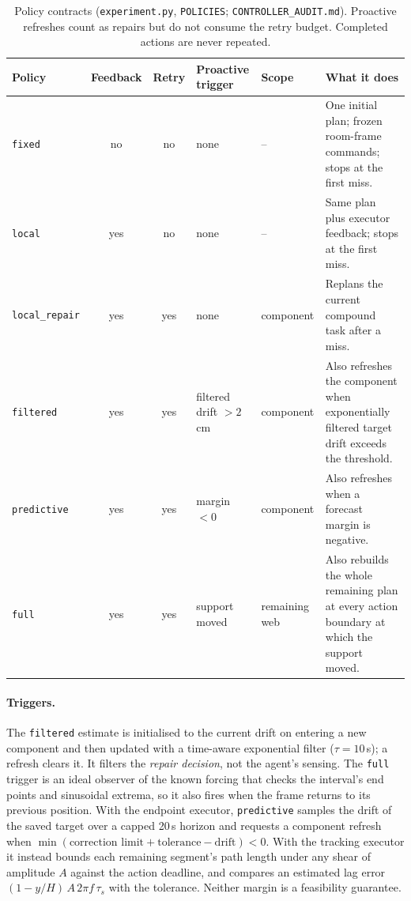 \begin{table}[htbp]
\centering
\small
\begin{tabularx}{\linewidth}{@{}l c c l l X@{}}
\toprule
Policy & Feedback & Retry & Proactive trigger & Scope & What it does \\
\midrule
\texttt{fixed} & no & no & none & -- & One initial plan; frozen room-frame commands; stops at the first miss. \\
\texttt{local} & yes & no & none & -- & Same plan plus executor feedback; stops at the first miss. \\
\texttt{local\_\allowbreak{}repair} & yes & yes & none & component & Replans the current compound task after a miss. \\
\texttt{filtered} & yes & yes & filtered drift $>2$\,cm & component & Also refreshes the component when exponentially filtered target drift exceeds the threshold. \\
\texttt{predictive} & yes & yes & margin $<0$ & component & Also refreshes when a forecast margin is negative. \\
\texttt{full} & yes & yes & support moved & remaining web & Also rebuilds the whole remaining plan at every action boundary at which the support moved. \\
\bottomrule
\end{tabularx}
\caption{Policy contracts (\texttt{experiment.py}, \texttt{POLICIES}; \texttt{CONTROLLER\_\allowbreak{}AUDIT.md}). Proactive
refreshes count as repairs but do not consume the retry budget. Completed actions are never repeated.}
\label{tab:mulder-policies}
\end{table}

\paragraph{Triggers.} The \texttt{filtered} estimate is initialised to the current drift on entering a
new component and then updated with a time-aware exponential filter ($\tau=10$\,s); a refresh clears it.
It filters the \emph{repair decision}, not the agent's sensing. The \texttt{full} trigger is an ideal
observer of the known forcing that checks the interval's end points and sinusoidal extrema, so it also
fires when the frame returns to its previous position. With the endpoint executor, \texttt{predictive}
samples the drift of the saved target over a capped 20\,s horizon and requests a component refresh when
$\min(\text{correction limit}+\text{tolerance}-\text{drift})<0$. With the tracking executor it instead
bounds each remaining segment's path length under any shear of amplitude $A$ against the action deadline,
and compares an estimated lag error $(1-y/H)\,A\,2\pi f\,\tau_s$ with the tolerance. Neither margin is a
feasibility guarantee.

